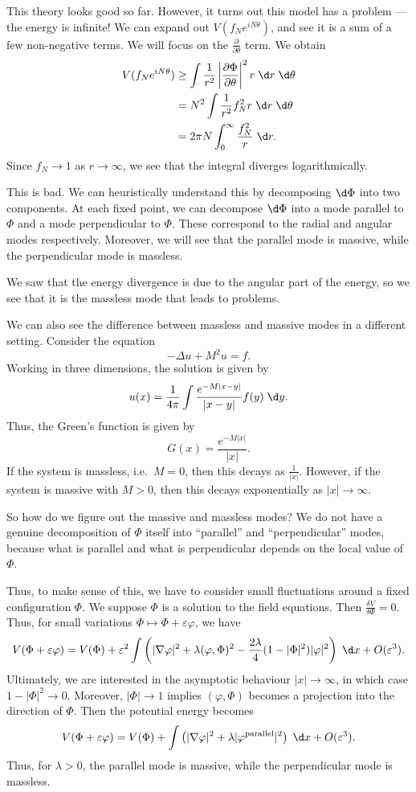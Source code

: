 \documentclass[a4paper]{article}
\begin{document}
This theory looks good so far. However, it turns out this model has a problem --- the energy is infinite! We can expand out $V(f_N e^{iN \theta})$, and see it is a sum of a few non-negative terms. We will focus on the $\frac{\partial}{\partial \theta}$ term. We obtain
\begin{align*}
  V(f_N e^{iN\theta}) &\geq \int \frac{1}{r^2} \left|\frac{\partial \Phi}{\partial \theta}\right|^2 r\;\d r\;\d \theta\\
  &= N^2 \int \frac{1}{r^2} f_N^2 r\;\d r\;\d \theta \\
  &= 2\pi N \int_0^\infty \frac{f_N^2}{r}\;\d r.
\end{align*}
Since $f_N \to 1$ as $r \to \infty$, we see that the integral diverges logarithmically.

This is bad. We can heuristically understand this by decomposing $\d \Phi$ into two components. At each fixed point, we can decompose $\d \Phi$ into a mode parallel to $\Phi$ and a mode perpendicular to $\Phi$. These correspond to the radial and angular modes respectively. Moreover, we will see that the parallel mode is massive, while the perpendicular mode is massless.

We saw that the energy divergence is due to the angular part of the energy, so we see that it is the massless mode that leads to problems.

We can also see the difference between massless and massive modes in a different setting. Consider the equation
\[
  -\Delta u + M^2 u = f.
\]
Working in three dimensions, the solution is given by
\[
  u(x) = \frac{1}{4\pi} \int \frac{e^{-M|x - y|}}{|x - y|} f(y)\;\d y.
\]
Thus, the Green's function is given by
\[
  G(x) = \frac{e^{-M|x|}}{|x|}.
\]
If the system is massless, i.e.\ $M = 0$, then this decays as $\frac{1}{|x|}$. However, if the system is massive with $M > 0$, then this decays exponentially as $|x| \to \infty$.

So how do we figure out the massive and massless modes? We do not have a genuine decomposition of $\Phi$ itself into ``parallel'' and ``perpendicular'' modes, because what is parallel and what is perpendicular depends on the local value of $\Phi$.

Thus, to make sense of this, we have to consider small fluctuations around a fixed configuration $\Phi$. We suppose $\Phi$ is a solution to the field equations. Then $\frac{\delta V}{\delta \Phi} = 0$. Thus, for small variations $\Phi \mapsto \Phi + \varepsilon \varphi$, we have
\[
  V(\Phi + \varepsilon \varphi) = V(\Phi) + \varepsilon^2 \int \left(|\nabla \varphi|^2 + \lambda (\varphi, \Phi)^2 - \frac{2\lambda}{4}(1 - |\Phi|^2)|\varphi|^2\right) \;\d x + O(\varepsilon^3).
\]
Ultimately, we are interested in the asymptotic behaviour $|x| \to \infty$, in which case $1 - |\Phi|^2 \to 0$. Moreover, $|\Phi| \to 1$ implies $(\varphi, \Phi)$ becomes a projection into the direction of $\Phi$. Then the potential energy becomes
\[
  V(\Phi + \varepsilon \varphi) = V(\Phi) + \int \left(|\nabla \varphi|^2 + \lambda |\varphi^{\mathrm{parallel}}|^2\right)\;\d x + O(\varepsilon^3).
\]
Thus, for $\lambda > 0$, the parallel mode is massive, while the perpendicular mode is massless.
\end{document}

